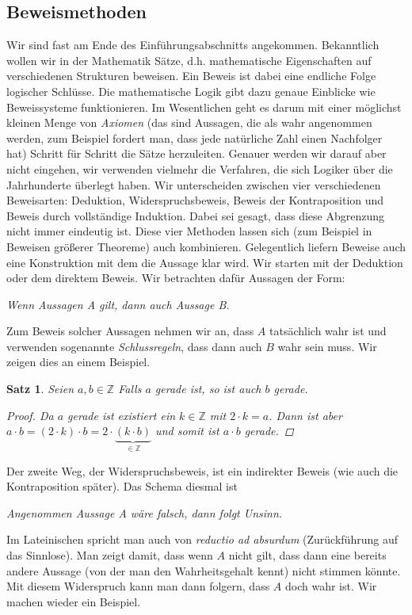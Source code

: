 \documentclass[11pt, a4paper]{article}
\theoremstyle{definition}
\theoremstyle{plain}
\newtheorem{theorem}[definition]{Satz}
\numberwithin{equation}{section}
\begin{document}
\subsection{Beweismethoden}\label{sec:pre_proofs}
Wir sind fast am Ende des Einführungsabschnitts angekommen. Bekanntlich wollen wir in der Mathematik Sätze, d.h. mathematische Eigenschaften auf verschiedenen Strukturen beweisen. Ein Beweis ist dabei eine endliche Folge logischer Schlüsse. Die mathematische Logik gibt dazu genaue Einblicke wie Beweissysteme funktionieren. Im Wesentlichen geht es darum mit einer möglichst kleinen Menge von \textit{Axiomen} (das sind Aussagen, die als wahr angenommen werden, zum Beispiel fordert man, dass jede natürliche Zahl einen Nachfolger hat) Schritt für Schritt die Sätze herzuleiten. Genauer werden wir darauf aber nicht eingehen, wir verwenden vielmehr die Verfahren, die sich Logiker über die Jahrhunderte überlegt haben. Wir unterscheiden zwischen vier verschiedenen Beweisarten: Deduktion, Widerspruchsbeweis, Beweis der Kontraposition und Beweis durch vollständige Induktion. Dabei sei gesagt, dass diese Abgrenzung nicht immer eindeutig ist. Diese vier Methoden lassen sich (zum Beispiel in Beweisen größerer Theoreme) auch kombinieren. Gelegentlich liefern Beweise auch eine Konstruktion mit dem die Aussage klar wird.
Wir starten mit der Deduktion oder dem direktem Beweis. Wir betrachten dafür Aussagen der Form: 
\begin{center}
	\textit{Wenn Aussagen A gilt, dann auch Aussage B.}
\end{center}
Zum Beweis solcher Aussagen nehmen wir an, dass $A$ tatsächlich wahr ist und verwenden sogenannte \textit{Schlussregeln}, dass dann auch $B$ wahr sein muss. Wir zeigen dies an einem Beispiel.
\begin{theorem}
	Seien $a, b \in \mathbb{Z}$ Falls $a$ gerade ist, so ist auch $b$ gerade.
	\begin{proof}
		Da $a$ gerade ist existiert ein $k \in \mathbb{Z}$ mit $2 \cdot k = a$. Dann ist aber $a \cdot b = (2 \cdot k) \cdot b = 2 \cdot \underbrace{(k \cdot b)}_{\in \mathbb{Z}}$ und somit ist $a \cdot b$ gerade.
	\end{proof}
\end{theorem}
Der zweite Weg, der Widerspruchsbeweis, ist ein indirekter Beweis (wie auch die Kontraposition später). Das Schema diesmal ist
\begin{center}
	\textit{Angenommen Aussage A wäre falsch, dann folgt Unsinn.}
\end{center}
Im Lateinischen spricht man auch von \textit{reductio ad absurdum} (Zurückführung auf das Sinnlose). Man zeigt damit, dass wenn $A$ nicht gilt, dass dann eine bereits andere Aussage (von der man den Wahrheitsgehalt kennt) nicht stimmen könnte. Mit diesem Widerspruch kann man dann folgern, dass $A$ doch wahr ist. Wir machen wieder ein Beispiel.
\end{document}
